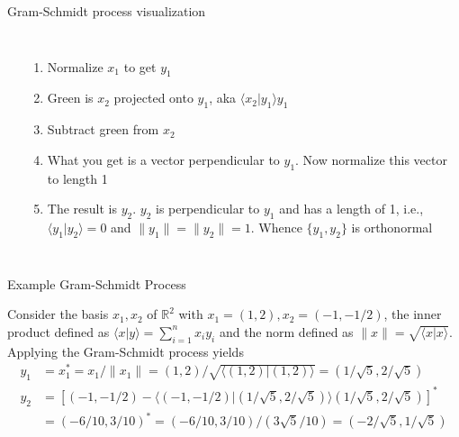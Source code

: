 \documentclass{beamer}
\begin{document}
\begin{frame}{Gram-Schmidt process visualization}
\begin{columns}
\begin{center}
            \end{center}
            \begin{enumerate}
                \item<2-> Normalize $x_1$ to get $y_1$
                \item<3-> Green is $x_2$ projected onto $y_1$, aka $\langle x_2 | y_1 \rangle y_1$
                \item<4-> Subtract green from $x_2$
                \item<5-> What you get is a vector perpendicular to $y_1$. Now normalize this vector to length 1
                \item<6-> The result is $y_2$. $y_2$ is perpendicular to $y_1$ and has a length of 1, i.e., $\langle y_1 | y_2 \rangle = 0$ and $\|y_1\| = \|y_2\| = 1$. Whence $\{ y_1, y_2 \}$ is orthonormal
            \end{enumerate}
    \end{columns}
\end{frame}

\begin{frame}{Example Gram-Schmidt Process}
    \begin{example}
        Consider the basis ${x_1, x_2}$ of $\mathbb{R}^2$ with $x_1 = (1,2), x_2 = (-1, -1/2)$,
        the inner product defined as $\langle x | y \rangle = \sum_{i=1}^{n}x_i y_i$ and the norm defined as $\| x \| = \sqrt{\langle x | x \rangle}$.\\
        Applying the Gram-Schmidt process yields
        \begin{align}
            y_1 &= x_1^* = x_1 / \| x_1 \| = (1,2) / \sqrt{\langle (1,2) | (1,2) \rangle} = (1/\sqrt{5}, 2/\sqrt{5})\\
            y_2 &= \left[ (-1,-1/2) - \langle (-1,-1/2) | (1/\sqrt{5}, 2/\sqrt{5}) \rangle (1/\sqrt{5}, 2/\sqrt{5}) \right]^*\\ \nonumber
            &= (-6/10, 3/10)^* = (-6/10, 3/10) / (3\sqrt{5} / 10) = (-2/\sqrt{5}, 1/\sqrt{5})
        \end{align}
    \end{example}
\end{frame}
\end{document}

